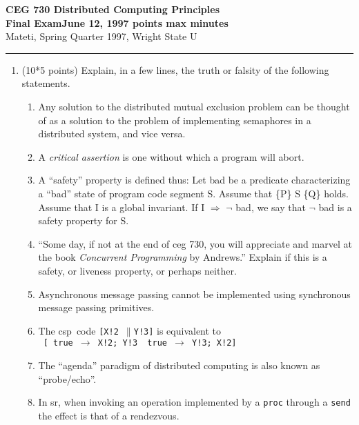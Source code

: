 \documentclass[12pt]{article}
\def\fat{\framebox[1mm]{\rule{0mm}{2mm}}}
\def\pr{$\parallel$}
\def\rar{$\rightarrow$}
\def\CSP{{\sc csp}}
\def\SR{{\sc sr}}
\begin{document}
{\bf CEG 
{\large \bf 730 Distributed Computing Principles}\\[5pt]
Final Exam\quad June 12, 1997 points max  minutes}\\
{Mateti,  Spring Quarter 1997, Wright State U}\\[-5pt]
\hrule

\begin{enumerate}

\item (10*5 points)
Explain, in a few lines, the truth or falsity of the following
statements.

\begin{enumerate}

\item
Any solution to the distributed mutual exclusion problem can be
thought of as a solution to the problem of implementing semaphores in
a distributed system, and vice versa.

\item
A {\em critical assertion} is one without which a program will abort.

\item
A ``safety'' property is defined thus: Let {\sc bad} be a {predicate}
characterizing a ``bad'' {state} of program code segment S.
Assume that {\{P\} S \{Q\}} holds.  Assume that I is a {global
invariant}.  If I $\Rightarrow$ $\neg$ {\sc bad}, we say that $\neg$
{\sc bad} is a safety property for S.

\item
``Some day, if not at the end of {\sc ceg} 730, you will appreciate
and marvel at the book {\em Concurrent Programming} by Andrews.''
Explain if this is a safety, or liveness property, or perhaps neither.



\item
Asynchronous message passing cannot be implemented using synchronous
message passing primitives.

\item
The \CSP\ code {\tt [X!2 \pr Y!3]} is equivalent to \\
{\tt
[  true \rar\ X!2; Y!3 \fat\ true \rar\ Y!3; X!2]}

\item
The ``agenda'' paradigm of distributed computing is also known as
``probe/echo''.

\item
In \SR, when invoking an operation implemented by a {\tt proc} through
a {\tt send} the effect is that of a rendezvous.


\end{enumerate}
\end{enumerate}
\end{document}
